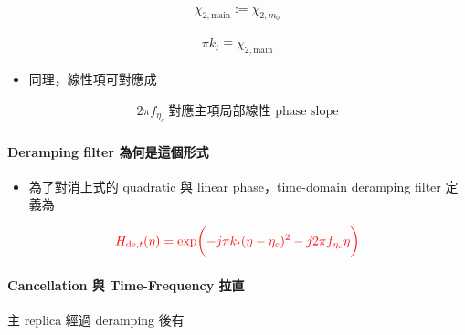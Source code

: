 \documentclass[10pt]{article}
\providecommand{\tightlist}{%
  \setlength{\itemsep}{0pt}\setlength{\parskip}{0pt}}
\begin{document}
\begin{equation}
\begin{aligned}
\chi_{2,\mathrm{main}}:=\chi_{2,m_0}
\end{aligned}
\end{equation}

\begin{equation}
\begin{aligned}
\pi k_t \equiv \chi_{2,\mathrm{main}}
\end{aligned}
\end{equation}

\begin{itemize}
\tightlist
\item
  同理，線性項可對應成
\end{itemize}

\begin{equation}
\begin{aligned}
2\pi f_{\eta_c}\;\text{對應主項局部線性 phase slope}
\end{aligned}
\end{equation}

\hypertarget{deramping-filter-ux70baux4f55ux662fux9019ux500bux5f62ux5f0f}{%
\paragraph{Deramping filter
為何是這個形式}\label{deramping-filter-ux70baux4f55ux662fux9019ux500bux5f62ux5f0f}}

\begin{itemize}
\tightlist
\item
  為了對消上式的 quadratic 與 linear phase，time-domain deramping filter
  定義為
\end{itemize}

\begin{equation}
\begin{aligned}
{\color{red}{H_{\mathrm{de},t}(\eta) = \exp\biggl( -j\pi k_t(\eta-\eta_c)^2 - j2\pi f_{\eta_c}\eta \biggr)}}
\end{aligned}
\end{equation}

\hypertarget{cancellation-ux8207-time-frequency-ux62c9ux76f4}{%
\paragraph{Cancellation 與 Time-Frequency
拉直}\label{cancellation-ux8207-time-frequency-ux62c9ux76f4}}

主 replica 經過 deramping 後有
\end{document}
